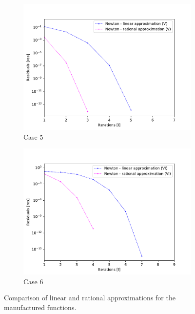\documentclass[11pt, oneside]{article}
\begin{document}
\begin{figure}
		\begin{subfigure}[b]{.45\linewidth}
			\includegraphics[width=\linewidth]{figure/5.pdf}
			\caption{Case 5}
		\end{subfigure}
		\begin{subfigure}[b]{.45\linewidth}
			\includegraphics[width=\linewidth]{figure/6.pdf}
			\caption{Case 6}
		\end{subfigure}
		\caption{Comparison of linear and rational approximations for the manufactured functions.}
		\label{fig:comparison1}
	\end{figure}
\end{document}
